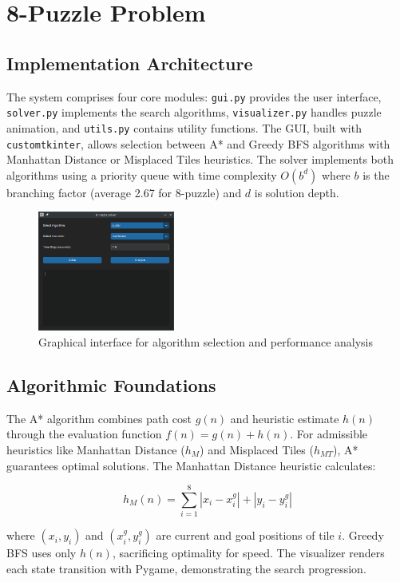 \documentclass{report}
\begin{document}
\chapter{8-Puzzle Problem}
\section{Implementation Architecture}
The system comprises four core modules: \texttt{gui.py} provides the user interface, \texttt{solver.py} implements the search algorithms, \texttt{visualizer.py} handles puzzle animation, and \texttt{utils.py} contains utility functions. The GUI, built with \texttt{customtkinter}, allows selection between A* and Greedy BFS algorithms with Manhattan Distance or Misplaced Tiles heuristics. The solver implements both algorithms using a priority queue with time complexity $O(b^d)$ where $b$ is the branching factor (average 2.67 for 8-puzzle) and $d$ is solution depth.

\begin{figure}[h]
	\centering
	\includegraphics[width=0.4\textwidth]{assets/gui2}
	\caption{Graphical interface for algorithm selection and performance analysis}
	\label{fig:gui2}
\end{figure}



\section{Algorithmic Foundations}
The A* algorithm combines path cost $g(n)$ and heuristic estimate $h(n)$ through the evaluation function $f(n) = g(n) + h(n)$. For admissible heuristics like Manhattan Distance ($h_M$) and Misplaced Tiles ($h_{MT}$), A* guarantees optimal solutions. The Manhattan Distance heuristic calculates:

\[ h_M(n) = \sum_{i=1}^{8} |x_i - x_i^g| + |y_i - y_i^g| \]

where $(x_i,y_i)$ and $(x_i^g,y_i^g)$ are current and goal positions of tile $i$. Greedy BFS uses only $h(n)$, sacrificing optimality for speed. The visualizer renders each state transition with Pygame, demonstrating the search progression.
\end{document}
